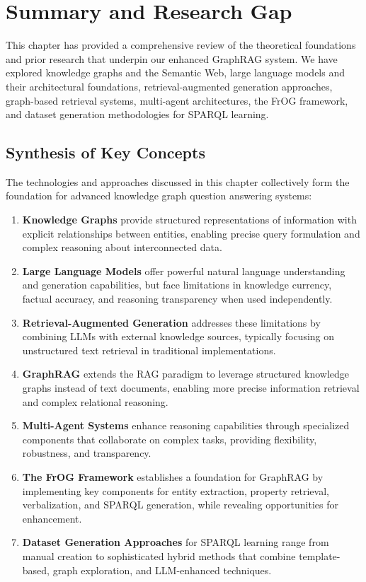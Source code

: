 \section{Summary and Research Gap}
\label{sec:summary}
This chapter has provided a comprehensive review of the theoretical foundations and prior research that underpin our enhanced GraphRAG system. We have explored knowledge graphs and the Semantic Web, large language models and their architectural foundations, retrieval-augmented generation approaches, graph-based retrieval systems, multi-agent architectures, the FrOG framework, and dataset generation methodologies for SPARQL learning.

\subsection{Synthesis of Key Concepts}
The technologies and approaches discussed in this chapter collectively form the foundation for advanced knowledge graph question answering systems:

\begin{enumerate}
    \item \textbf{Knowledge Graphs} provide structured representations of information with explicit relationships between entities, enabling precise query formulation and complex reasoning about interconnected data.
    
    \item \textbf{Large Language Models} offer powerful natural language understanding and generation capabilities, but face limitations in knowledge currency, factual accuracy, and reasoning transparency when used independently.
    
    \item \textbf{Retrieval-Augmented Generation} addresses these limitations by combining LLMs with external knowledge sources, typically focusing on unstructured text retrieval in traditional implementations.
    
    \item \textbf{GraphRAG} extends the RAG paradigm to leverage structured knowledge graphs instead of text documents, enabling more precise information retrieval and complex relational reasoning.
    
    \item \textbf{Multi-Agent Systems} enhance reasoning capabilities through specialized components that collaborate on complex tasks, providing flexibility, robustness, and transparency.
    
    \item \textbf{The FrOG Framework} establishes a foundation for GraphRAG by implementing key components for entity extraction, property retrieval, verbalization, and SPARQL generation, while revealing opportunities for enhancement.
    
    \item \textbf{Dataset Generation Approaches} for SPARQL learning range from manual creation to sophisticated hybrid methods that combine template-based, graph exploration, and LLM-enhanced techniques.
\end{enumerate}

